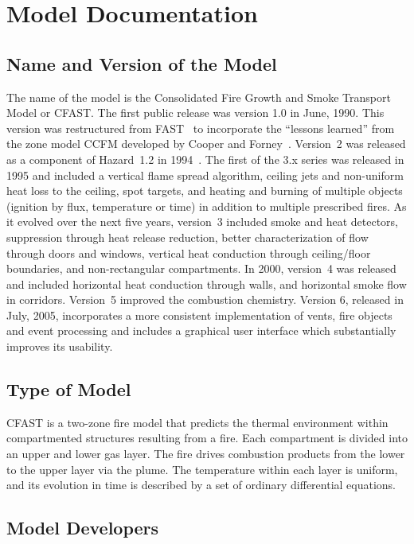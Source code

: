 \section{Model Documentation}

\subsection{Name and Version of the Model}

The name of the model is the Consolidated Fire Growth and Smoke Transport Model or CFAST. The first public release was version 1.0 in June, 1990. This version was restructured from FAST~\cite{Models:FAST} to incorporate the ``lessons learned'' from the zone model CCFM developed by Cooper and Forney~\cite{Models:CCFM}. Version~2 was released as a component of Hazard~1.2 in 1994~\cite{Models:HAZARDI, Models:HAZARDI_12}. The first of the 3.x series was released in 1995 and included a vertical flame spread algorithm, ceiling jets and non-uniform heat loss to the ceiling, spot targets, and heating and burning of multiple objects (ignition by flux, temperature or time) in addition to multiple prescribed fires. As it evolved over the next five years, version~3 included smoke and heat detectors, suppression through heat release reduction, better characterization of flow through doors and windows, vertical heat conduction through ceiling/floor boundaries, and non-rectangular compartments. In 2000, version~4 was released and included horizontal heat conduction through walls, and horizontal smoke flow in corridors. Version~5 improved the combustion chemistry. Version 6, released in July, 2005, incorporates a more consistent implementation of vents, fire objects and event processing and includes a graphical user interface which substantially improves its usability.

\subsection{Type of Model}

CFAST is a two-zone fire model that predicts the thermal environment within compartmented structures resulting from a fire. Each compartment is divided into an upper and lower gas layer. The fire drives combustion products from the lower to the upper layer via the plume. The temperature within each layer is uniform, and its evolution in time is described by a set of ordinary differential equations.

\subsection{Model Developers}

